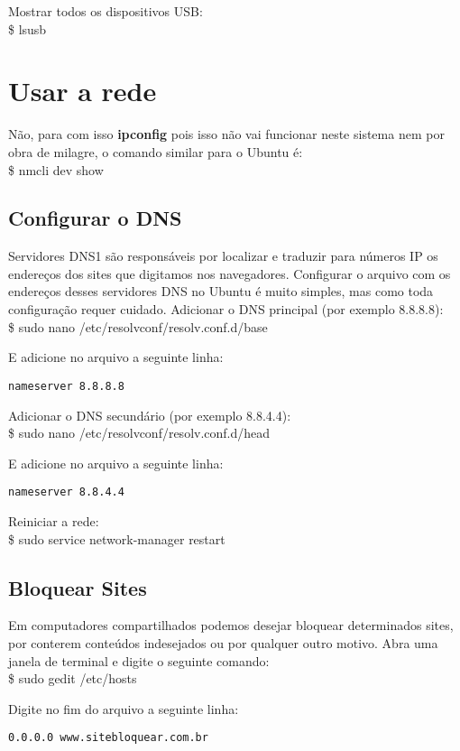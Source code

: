Mostrar todos os dispositivos USB: \\
{\ttfamily\$ lsusb}

\section{Usar a rede}
Não, para com isso \textbf{ipconfig} pois isso não vai funcionar neste sistema nem por obra de milagre, o comando similar para o Ubuntu é: \\
{\ttfamily\$ nmcli dev show}

\subsection{Configurar o DNS}
Servidores DNS1 são responsáveis por localizar e traduzir para números IP os endereços dos sites que digitamos nos navegadores. Configurar o arquivo com os endereços desses servidores DNS no Ubuntu é muito simples, mas como toda configuração requer cuidado. Adicionar o DNS principal (por exemplo 8.8.8.8): \\
{\ttfamily\$ sudo nano /etc/resolvconf/resolv.conf.d/base}

E adicione no arquivo a seguinte linha:
\begin{lstlisting}
nameserver 8.8.8.8
\end{lstlisting}

Adicionar o DNS secundário (por exemplo 8.8.4.4): \\
{\ttfamily\$ sudo nano /etc/resolvconf/resolv.conf.d/head}

E adicione no arquivo a seguinte linha:
\begin{lstlisting}
nameserver 8.8.4.4
\end{lstlisting}

Reiniciar a rede: \\
{\ttfamily\$ sudo service network-manager restart}

\subsection{Bloquear Sites}
Em computadores compartilhados podemos desejar bloquear determinados sites, por conterem conteúdos indesejados ou por qualquer outro motivo. Abra uma janela de terminal e digite o seguinte comando: \\
{\ttfamily\$ sudo gedit /etc/hosts}

Digite no fim do arquivo a seguinte linha:
\begin{lstlisting}
0.0.0.0 www.sitebloquear.com.br
\end{lstlisting}

